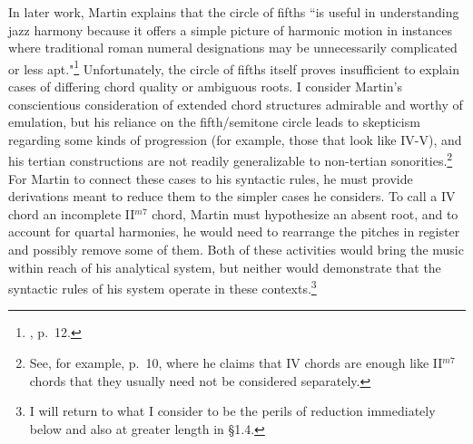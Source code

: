 In later work, Martin explains that the circle of fifths ``is useful in understanding jazz harmony because it offers a simple picture of harmonic motion in instances where traditional roman numeral designations may be unnecessarily complicated or less apt."\footnote{\cite{martin1988}, p.\ 12.}  Unfortunately, the circle of fifths itself proves insufficient to explain cases of differing chord quality or ambiguous roots.  I consider Martin's conscientious consideration of extended chord structures admirable and worthy of emulation, but his reliance on the fifth/semitone circle leads to skepticism regarding some kinds of progression (for example, those that look like IV-V), and his tertian constructions are not readily generalizable to non-tertian sonorities.\footnote{See, for example, \cite{martin1988} p.\ 10, where he claims that IV chords are enough like II$^{m7}$ chords that they usually need not be considered separately.}  For Martin to connect these cases to his syntactic rules, he must provide derivations meant to reduce them to the simpler cases he considers.  To call a IV chord an incomplete II$^{m7}$ chord, Martin must hypothesize an absent root, and to account for quartal harmonies, he would need to rearrange the pitches in register and possibly remove some of them.  Both of these activities would bring the music within reach of his analytical system, but neither would demonstrate that the syntactic rules of his system operate in these contexts.\footnote{I will return to what I consider to be the perils of reduction immediately below and also at greater length in \S 1.4.}

